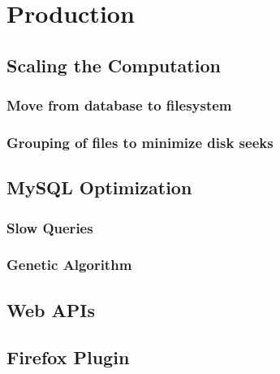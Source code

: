 \chapter{Production}
    \section{Scaling the Computation}
        \subsection{Move from database to filesystem}
        \subsection{Grouping of files to minimize disk seeks}
    \section{MySQL Optimization}
        \subsection{Slow Queries}
        \subsection{Genetic Algorithm}
    \section{Web APIs}
    \section{Firefox Plugin}


